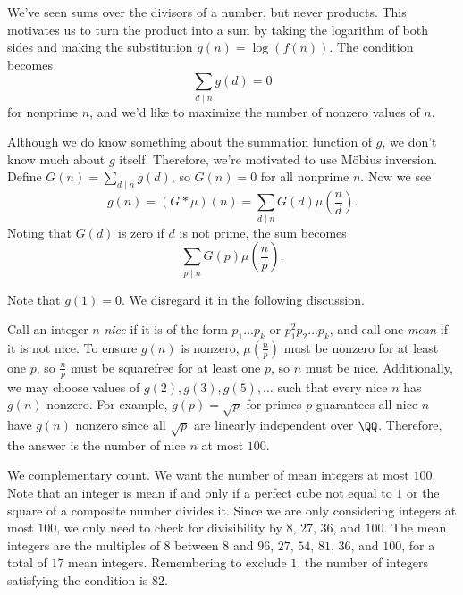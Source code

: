 \documentclass[11pt]{scrartcl}
\begin{document}
\begin{solution}{}
	We've seen sums over the divisors of a number, but never products. This motivates us to turn the product into a sum by taking the logarithm of both sides and making the substitution $g(n) = \log(f(n))$. The condition becomes
	\[\sum_{d \mid n}g(d) = 0\]
	for nonprime $n$, and we'd like to maximize the number of nonzero values of $n$.

	Although we do know something about the summation function of $g$, we don't know much about $g$ itself. Therefore, we're motivated to use M\"obius inversion. Define $G(n) = \sum_{d \mid n}g(d)$, so $G(n) = 0$ for all nonprime $n$. Now we see
	\[g(n) = (G \ast \mu)(n) = \sum_{d \mid n}G(d)\mu\left(\frac{n}{d}\right).\]
	Noting that $G(d)$ is zero if $d$ is not prime, the sum becomes
	\[\sum_{p \mid n}G(p)\mu\left(\frac{n}{p}\right).\]

	Note that $g(1) = 0$. We disregard it in the following discussion.

	Call an integer $n$ \emph{nice} if it is of the form $p_1\dots p_k$ or $p_1^2p_2\dots p_k$, and call one \emph{mean} if it is not nice. To ensure $g(n)$ is nonzero, $\mu\left(\frac{n}{p}\right)$ must be nonzero for at least one $p$, so $\frac{n}{p}$ must be squarefree for at least one $p$, so $n$ must be nice. Additionally, we may choose values of $g(2),g(3),g(5),\dots$ such that every nice $n$ has $g(n)$ nonzero. For example, $g(p) = \sqrt{p}$ for primes $p$ guarantees all nice $n$ have $g(n)$ nonzero since all $\sqrt{p}$ are linearly independent over $\QQ$. Therefore, the answer is the number of nice $n$ at most $100$.

	We complementary count. We want the number of mean integers at most $100$. Note that an integer is mean if and only if a perfect cube not equal to $1$ or the square of a composite number divides it. Since we are only considering integers at most $100$, we only need to check for divisibility by $8$, $27$, $36$, and $100$. The mean integers are the multiples of $8$ between $8$ and $96$, $27$, $54$, $81$, $36$, and $100$, for a total of $17$ mean integers. Remembering to exclude $1$, the number of integers satisfying the condition is $82$.
\end{solution}
\end{document}
